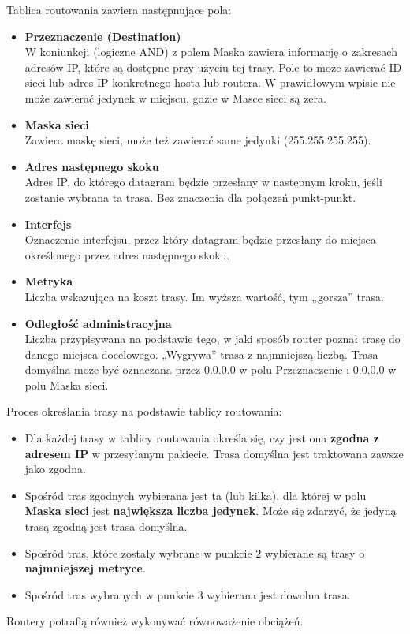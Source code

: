 \documentclass[../main.tex]{subfiles}
\begin{document}
    Tablica routowania zawiera następnujące pola:
    \begin{itemize}
        \item \textbf{Przeznaczenie (Destination)}\\
        W koniunkcji (logiczne AND) z polem Maska zawiera informację o zakresach adresów IP, które są dostępne przy użyciu tej trasy. Pole to może zawierać ID
        sieci lub adres IP konkretnego hosta lub routera. W prawidłowym wpisie nie może zawierać jedynek w miejscu, gdzie w Masce sieci są zera.
        \item \textbf{Maska sieci}\\
        Zawiera maskę sieci, może też zawierać same jedynki (255.255.255.255).
        \item \textbf{Adres następnego skoku}\\
        Adres IP, do którego datagram będzie przesłany w następnym kroku, jeśli zostanie wybrana ta trasa. Bez znaczenia dla połączeń punkt-punkt.
        \item \textbf{Interfejs}\\
        Oznaczenie interfejsu, przez który datagram będzie przesłany do miejsca określonego przez adres następnego skoku.
        \item \textbf{Metryka}\\
        Liczba wskazująca na koszt trasy. Im wyższa wartość, tym „gorsza” trasa.
        \item \textbf{Odległość administracyjna}\\
        Liczba przypisywana na podstawie tego, w jaki sposób router poznał trasę do danego miejsca docelowego. „Wygrywa” trasa z najmniejszą liczbą. Trasa domyślna może być oznaczana przez 0.0.0.0 w polu Przeznaczenie i 0.0.0.0 w polu Maska sieci.
    \end{itemize}

    Proces określania trasy na podstawie tablicy routowania:
    \begin{itemize}
        \item Dla każdej trasy w tablicy routowania określa się, czy jest ona \textbf{zgodna z adresem IP} w przesyłanym pakiecie. Trasa domyślna jest traktowana zawsze jako zgodna.
        \item Spośród tras zgodnych wybierana jest ta (lub kilka), dla której w polu \textbf{Maska sieci} jest \textbf{największa liczba jedynek}. Może się zdarzyć, że jedyną trasą zgodną jest trasa domyślna.
        \item Spośród tras, które zostały wybrane w punkcie 2 wybierane są trasy o \textbf{najmniejszej metryce}.
        \item Spośród tras wybranych w punkcie 3 wybierana jest dowolna trasa.
    \end{itemize}
    Routery potrafią również wykonywać równoważenie obciążeń.
\end{document}
